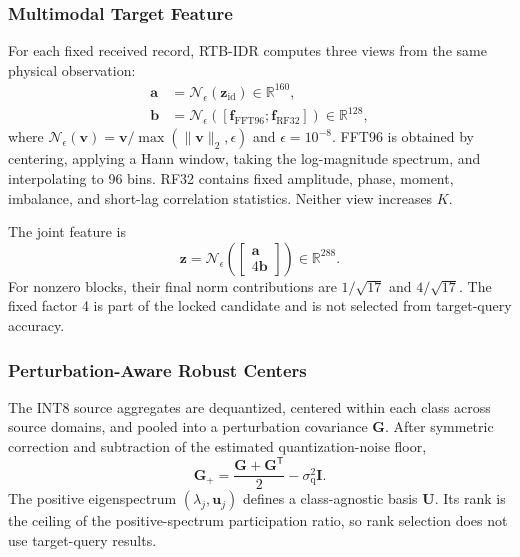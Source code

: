 \documentclass[journal]{IEEEtran}
\newcommand{\stagehead}{RTB-IDR}
\begin{document}
\subsubsection{Multimodal Target Feature}

For each fixed received record, \stagehead{} computes three views from the same physical observation:
\begin{align}
\mathbf{a} &=
\mathcal{N}_{\epsilon}(\mathbf{z}_{\mathrm{id}})
\in\mathbb{R}^{160},\\
\mathbf{b} &=
\mathcal{N}_{\epsilon}
\left(
\left[
\mathbf{f}_{\mathrm{FFT96}};
\mathbf{f}_{\mathrm{RF32}}
\right]\right)
\in\mathbb{R}^{128},
\end{align}
where \(\mathcal{N}_{\epsilon}(\mathbf{v})=
\mathbf{v}/\max(\|\mathbf{v}\|_2,\epsilon)\) and \(\epsilon=10^{-8}\).
FFT96 is obtained by centering, applying a Hann window, taking the log-magnitude spectrum, and interpolating to 96 bins. RF32 contains fixed amplitude, phase, moment, imbalance, and short-lag correlation statistics. Neither view increases \(K\).

The joint feature is
\begin{equation}
\mathbf{z} =
\mathcal{N}_{\epsilon}
\left(
\begin{bmatrix}
\mathbf{a}\\4\mathbf{b}
\end{bmatrix}
\right)
\in\mathbb{R}^{288}.
\label{eq:joint}
\end{equation}
For nonzero blocks, their final norm contributions are \(1/\sqrt{17}\) and \(4/\sqrt{17}\). The fixed factor 4 is part of the locked candidate and is not selected from target-query accuracy.

\subsubsection{Perturbation-Aware Robust Centers}

The INT8 source aggregates are dequantized, centered within each class across source domains, and pooled into a perturbation covariance \(\mathbf{G}\). After symmetric correction and subtraction of the estimated quantization-noise floor,
\begin{equation}
\mathbf{G}_{+} =
\frac{\mathbf{G}+\mathbf{G}^{\mathsf T}}{2}
-\sigma_{\mathrm{q}}^{2}\mathbf{I}.
\end{equation}
The positive eigenspectrum \((\lambda_j,\mathbf{u}_j)\) defines a class-agnostic basis \(\mathbf{U}\). Its rank is the ceiling of the positive-spectrum participation ratio, so rank selection does not use target-query results.
\end{document}
